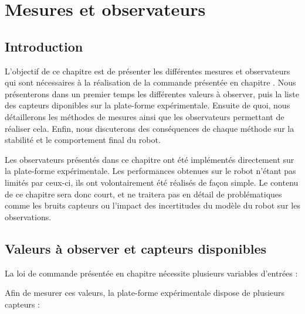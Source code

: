 \chapter{Mesures et observateurs}
\label{chapitre.observateur}
	\section{Introduction}
	
		L'objectif de ce chapitre est de présenter les différentes mesures et observateurs qui sont nécessaires à la réalisation de la commande présentée en chapitre .
		Nous présenterons dans un premier temps les différentes valeurs à observer, puis la liste des capteurs diponibles sur la plate-forme expérimentale.
		Ensuite de quoi, nous détaillerons les méthodes de mesures ainsi que les observateurs permettant de réaliser cela. 
		Enfin, nous discuterons des conséquences de chaque méthode sur la stabilité et le comportement final du robot.
		
		Les observateurs présentés dans ce chapitre ont été implémentés directement sur la plate-forme expérimentale. 
		Les performances obtenues sur le robot n'étant pas limités par ceux-ci, ils ont volontairement été réalisés de façon simple.
		Le contenu de ce chapitre sera donc court, et ne traitera pas en détail de problématiques comme les bruits capteurs ou l'impact des incertitudes du modèle du robot sur les observations.
	
	\section{Valeurs à observer et capteurs disponibles}
	
		La loi de commande présentée en chapitre  nécessite plusieurs variables d'entrées :
		
		Afin de mesurer ces valeurs, la plate-forme expérimentale dispose de plusieurs capteurs :
		
